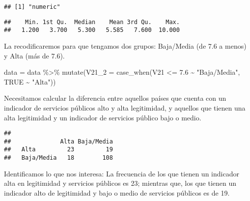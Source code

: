 \documentclass[
]{article}
\newenvironment{Shaded}{\begin{snugshade}}{\end{snugshade}}
\newcommand{\AttributeTok}[1]{\textcolor[rgb]{0.77,0.63,0.00}{#1}}
\newcommand{\CommentTok}[1]{\textcolor[rgb]{0.56,0.35,0.01}{\textit{#1}}}
\newcommand{\ConstantTok}[1]{\textcolor[rgb]{0.00,0.00,0.00}{#1}}
\newcommand{\FloatTok}[1]{\textcolor[rgb]{0.00,0.00,0.81}{#1}}
\newcommand{\FunctionTok}[1]{\textcolor[rgb]{0.00,0.00,0.00}{#1}}
\newcommand{\NormalTok}[1]{#1}
\newcommand{\OtherTok}[1]{\textcolor[rgb]{0.56,0.35,0.01}{#1}}
\newcommand{\SpecialCharTok}[1]{\textcolor[rgb]{0.00,0.00,0.00}{#1}}
\newcommand{\StringTok}[1]{\textcolor[rgb]{0.31,0.60,0.02}{#1}}
\begin{document}
\begin{verbatim}
## [1] "numeric"
\end{verbatim}

\begin{Shaded}
\end{Shaded}

\begin{verbatim}
##    Min. 1st Qu.  Median    Mean 3rd Qu.    Max. 
##   1.200   3.700   5.300   5.585   7.600  10.000
\end{verbatim}

La recodificaremos para que tengamos dos grupos: Baja/Media (de 7.6 a
menos) y Alta (más de 7.6).

\begin{Shaded}
\begin{Highlighting}[]
\NormalTok{data }\OtherTok{=}\NormalTok{ data }\SpecialCharTok{\%\textgreater{}\%}
  \FunctionTok{mutate}\NormalTok{(}\AttributeTok{V21\_2 =} \FunctionTok{case\_when}\NormalTok{(V21 }\SpecialCharTok{\textless{}=} \FloatTok{7.6} \SpecialCharTok{\textasciitilde{}} \StringTok{"Baja/Media"}\NormalTok{,}
                          \ConstantTok{TRUE} \SpecialCharTok{\textasciitilde{}} \StringTok{"Alta"}\NormalTok{))}
\end{Highlighting}
\end{Shaded}

Necesitamos calcular la diferencia entre aquellos países que cuenta con
un indicador de servicios públicos alto y alta legitimidad, y aquellos
que tienen una alta legitimidad y un indicador de servicios público bajo
o medio.

\begin{Shaded}
\end{Shaded}

\begin{verbatim}
##             
##              Alta Baja/Media
##   Alta         23         19
##   Baja/Media   18        108
\end{verbatim}

Identificamos lo que nos interesa: La frecuencia de los que tienen un
indicador alta en legitimidad y servicios públicos es 23; mientras que,
los que tienen un indicador alto de legitimidad y bajo o medio de
servicios públicos es de 19.
\end{document}
